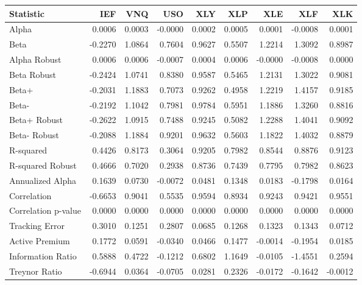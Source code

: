 \begin{tabular}{lrrrrrrrr}
\toprule
Statistic & IEF & VNQ & USO & XLY & XLP & XLE & XLF & XLK \\
\midrule
Alpha & 0.0006 & 0.0003 & -0.0000 & 0.0002 & 0.0005 & 0.0001 & -0.0008 & 0.0001 \\
Beta & -0.2270 & 1.0864 & 0.7604 & 0.9627 & 0.5507 & 1.2214 & 1.3092 & 0.8987 \\
Alpha Robust & 0.0006 & 0.0006 & -0.0007 & 0.0004 & 0.0006 & -0.0000 & -0.0008 & 0.0000 \\
Beta Robust & -0.2424 & 1.0741 & 0.8380 & 0.9587 & 0.5465 & 1.2131 & 1.3022 & 0.9081 \\
Beta+ & -0.2031 & 1.1883 & 0.7073 & 0.9262 & 0.4958 & 1.2219 & 1.4157 & 0.9185 \\
Beta- & -0.2192 & 1.1042 & 0.7981 & 0.9784 & 0.5951 & 1.1886 & 1.3260 & 0.8816 \\
Beta+ Robust & -0.2622 & 1.0915 & 0.7488 & 0.9245 & 0.5082 & 1.2288 & 1.4041 & 0.9092 \\
Beta- Robust & -0.2088 & 1.1884 & 0.9201 & 0.9632 & 0.5603 & 1.1822 & 1.4032 & 0.8879 \\
R-squared & 0.4426 & 0.8173 & 0.3064 & 0.9205 & 0.7982 & 0.8544 & 0.8876 & 0.9123 \\
R-squared Robust & 0.4666 & 0.7020 & 0.2938 & 0.8736 & 0.7439 & 0.7795 & 0.7982 & 0.8623 \\
Annualized Alpha & 0.1639 & 0.0730 & -0.0072 & 0.0481 & 0.1348 & 0.0183 & -0.1798 & 0.0164 \\
Correlation & -0.6653 & 0.9041 & 0.5535 & 0.9594 & 0.8934 & 0.9243 & 0.9421 & 0.9551 \\
Correlation p-value & 0.0000 & 0.0000 & 0.0000 & 0.0000 & 0.0000 & 0.0000 & 0.0000 & 0.0000 \\
Tracking Error & 0.3010 & 0.1251 & 0.2807 & 0.0685 & 0.1268 & 0.1323 & 0.1343 & 0.0712 \\
Active Premium & 0.1772 & 0.0591 & -0.0340 & 0.0466 & 0.1477 & -0.0014 & -0.1954 & 0.0185 \\
Information Ratio & 0.5888 & 0.4722 & -0.1212 & 0.6802 & 1.1649 & -0.0105 & -1.4551 & 0.2594 \\
Treynor Ratio & -0.6944 & 0.0364 & -0.0705 & 0.0281 & 0.2326 & -0.0172 & -0.1642 & -0.0012 \\
\bottomrule
\end{tabular}
